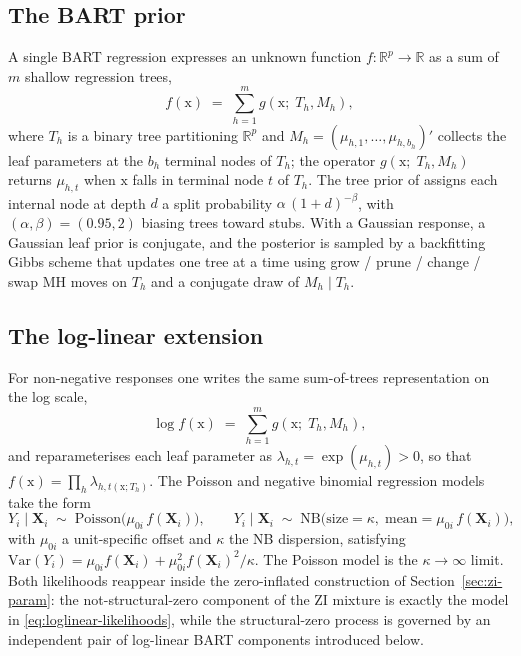 \documentclass[11pt]{article}
\theoremstyle{plain}
\theoremstyle{definition}
\theoremstyle{remark}
\newcommand{\Poi}{\mathrm{Poisson}}
\newcommand{\NB}{\mathrm{NB}}
\newcommand{\X}{\mathbf{X}}
\newcommand{\x}{\mathrm{x}}
\newcommand{\Var}{\mathrm{Var}}
\begin{document}
\subsection{The BART prior}\label{sec:bart-prior}

A single BART regression \citep{chipman2010bart} expresses an unknown
function $f : \mathbb{R}^p \to \mathbb{R}$ as a sum of $m$ shallow
regression trees,
\begin{equation}
  f(\x) \;=\; \sum_{h=1}^{m} g(\x;\; T_h, M_h),
  \label{eq:bart-sum}
\end{equation}
where $T_h$ is a binary tree partitioning $\mathbb{R}^p$ and
$M_h = (\mu_{h,1}, \dots, \mu_{h, b_h})'$ collects the leaf parameters
at the $b_h$ terminal nodes of $T_h$; the operator $g(\x;\; T_h, M_h)$
returns $\mu_{h,t}$ when $\x$ falls in terminal node $t$ of $T_h$. The
tree prior of \citet{chipman1998bayesian} assigns each internal node
at depth $d$ a split probability $\alpha\,(1+d)^{-\beta}$, with
$(\alpha, \beta) = (0.95, 2)$ biasing trees toward stubs. With a
Gaussian response, a Gaussian leaf prior is conjugate, and the
posterior is sampled by a backfitting Gibbs scheme that updates one
tree at a time using grow / prune / change / swap MH moves on $T_h$
and a conjugate draw of $M_h \mid T_h$.

\subsection{The log-linear extension}\label{sec:loglinear-extension}

For non-negative responses one writes the same sum-of-trees
representation on the log scale,
\begin{equation}
  \log f(\x) \;=\; \sum_{h=1}^{m} g(\x;\; T_h, M_h),
  \label{eq:loglinear-bart}
\end{equation}
and reparameterises each leaf parameter as
$\lambda_{h,t} = \exp(\mu_{h,t}) > 0$, so that
$f(\x) = \prod_h \lambda_{h, t(\x; T_h)}$. The Poisson and negative
binomial regression models take the form
\begin{equation}
  Y_i \mid \X_i \;\sim\; \Poi\bigl(\mu_{0i}\, f(\X_i)\bigr),
  \qquad
  Y_i \mid \X_i \;\sim\; \NB\bigl(\mathrm{size} = \kappa,\;
                                  \mathrm{mean} = \mu_{0i}\, f(\X_i)\bigr),
  \label{eq:loglinear-likelihoods}
\end{equation}
with $\mu_{0i}$ a unit-specific offset and $\kappa$ the NB dispersion,
satisfying $\Var(Y_i) = \mu_{0i} f(\X_i) + \mu_{0i}^2 f(\X_i)^2 /
\kappa$. The Poisson model is the $\kappa \to \infty$ limit. Both
likelihoods reappear inside the zero-inflated construction of
Section~\ref{sec:zi-param}: the not-structural-zero component of the
ZI mixture is exactly the model in \eqref{eq:loglinear-likelihoods},
while the structural-zero process is governed by an independent pair
of log-linear BART components introduced below.
\end{document}
